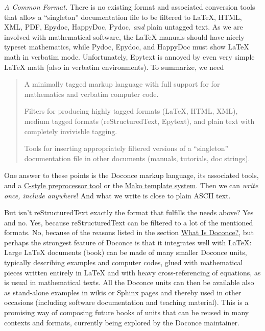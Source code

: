 \documentclass[a4paper,english]{article}
\begin{document}
\emph{A Common Format.} There is no existing format and associated
conversion tools that allow a ``singleton'' documentation file to be
filtered to LaTeX, HTML, XML, PDF, Epydoc, HappyDoc, Pydoc, \emph{and} plain
untagged text. As we are involved with mathematical software, the
LaTeX manuals should have nicely typeset mathematics, while Pydoc,
Epydoc, and HappyDoc must show LaTeX math in verbatim mode.
Unfortunately, Epytext is annoyed by even very simple LaTeX math (also
in verbatim environments). To summarize, we need
%
\begin{quote}
\setcounter{listcnt0}{0}
\begin{list}{.}
{
\setlength{\rightmargin}{\leftmargin}
}

\item A minimally tagged markup language with full support for
for mathematics and verbatim computer code.

\item Filters for producing highly tagged formats (LaTeX, HTML, XML),
medium tagged formats (reStructuredText, Epytext), and plain
text with completely invivisble tagging.

\item Tools for inserting appropriately filtered versions of a ``singleton''
documentation file in other documents (manuals, tutorials, doc strings).
\end{list}

\end{quote}

One answer to these points is the Doconce markup language, its
associated tools, and a \href{http://code.google.com/p/preprocess}{C-style preprocessor tool} or the \href{http://www.makotemplates.org/}{Mako template system}.  Then we can \emph{write once, include
anywhere}!  And what we write is close to plain ASCII text.

But isn't reStructuredText exactly the format that fulfills the needs
above? Yes and no. Yes, because reStructuredText can be filtered to a
lot of the mentioned formats. No, because of the reasons listed
in the section \hyperref[id1]{What Is Doconce?}, but perhaps the strongest feature
of Doconce is that it integrates well with LaTeX: Large LaTeX documents (book)
can be made of many smaller Doconce units, typically describing examples
and computer codes, glued with mathematical pieces written entirely
in LaTeX and with heavy cross-referencing of equations, as is usual
in mathematical texts. All the Doconce units can then be available
also as stand-alone examples in wikis or Sphinx pages and thereby used
in other occasions (including software documentation and teaching material).
This is a promising way of composing future books of units that can
be reused in many contexts and formats, currently being explored by
the Doconce maintainer.
\end{document}

